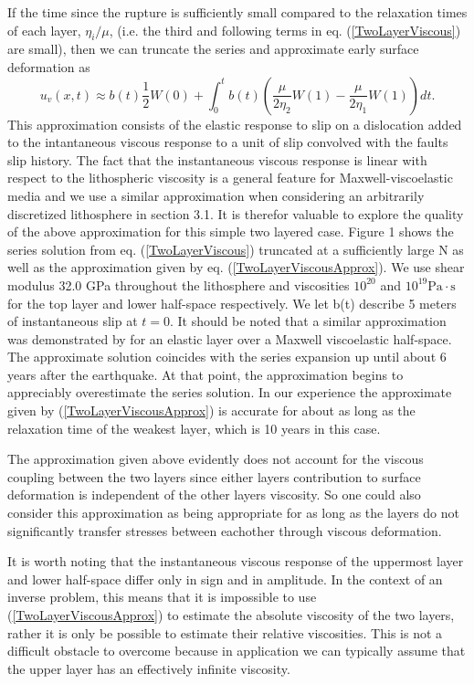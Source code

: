 \documentclass[12pt]{article}
\begin{document}
If the time since the rupture is sufficiently small compared to the
relaxation times of each layer, $\eta_i/\mu$, (i.e. the third and
following terms in eq. (\ref{TwoLayerViscous}) are small), then we can
truncate the series and approximate early surface deformation as
\begin{equation}\label{TwoLayerViscousApprox}
 u_v(x,t) \approx b(t)\frac{1}{2}W(0) + 
          \int_0^t b(t)\left(\frac{\mu}{2\eta_2}W(1) - \frac{\mu}{2\eta_1}W(1)\right)dt.
\end{equation} 
This approximation consists of the elastic response to slip on a
dislocation added to the intantaneous viscous response to a unit of
slip convolved with the faults slip history.  The fact that the
instantaneous viscous response is linear with respect to the
lithospheric viscosity is a general feature for Maxwell-viscoelastic
media and we use a similar approximation when considering an
arbitrarily discretized lithosphere in section 3.1.  It is therefor
valuable to explore the quality of the above approximation for this
simple two layered case. Figure 1 shows the series solution from
eq. (\ref{TwoLayerViscous}) truncated at a sufficiently large N as
well as the approximation given by eq. (\ref{TwoLayerViscousApprox}).
We use shear modulus 32.0 GPa throughout the lithosphere and
viscosities $10^{20}$ and $10^{19} \mathrm{Pa}\cdot\mathrm{s}$ for the
top layer and lower half-space respectively.  We let b(t) describe 5
meters of instantaneous slip at $t=0$.  It should be noted that a
similar approximation was demonstrated by \citet{S2010} for an elastic
layer over a Maxwell viscoelastic half-space.  The approximate
solution coincides with the series expansion up until about 6 years
after the earthquake.  At that point, the approximation begins to
appreciably overestimate the series solution.  In our experience the
approximate given by (\ref{TwoLayerViscousApprox}) is accurate for
about as long as the relaxation time of the weakest layer, which is 10
years in this case.

The approximation given above evidently does not account for the
viscous coupling between the two layers since either layers
contribution to surface deformation is independent of the other layers
viscosity.  So one could also consider this approximation as being
appropriate for as long as the layers do not significantly transfer
stresses between eachother through viscous deformation.

It is worth noting that the instantaneous viscous response of the
uppermost layer and lower half-space differ only in sign and in
amplitude.  In the context of an inverse problem, this means that it
is impossible to use (\ref{TwoLayerViscousApprox}) to estimate the
absolute viscosity of the two layers, rather it is only be possible
to estimate their relative viscosities.  This is not a difficult
obstacle to overcome because in application we can typically assume
that the upper layer has an effectively infinite viscosity.
\end{document}
